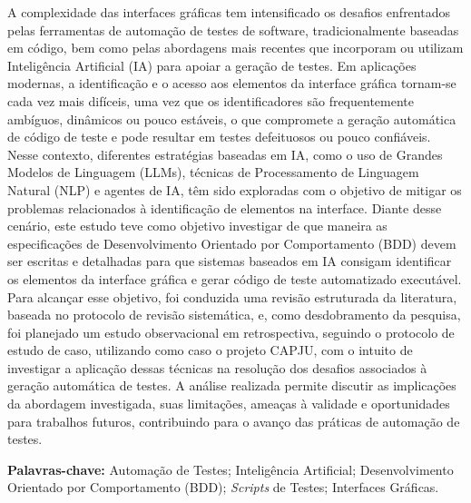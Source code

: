 \begin{resumo}
    A complexidade das interfaces gráficas tem intensificado os desafios enfrentados pelas ferramentas de automação de testes de software, tradicionalmente baseadas em código, bem como pelas abordagens mais recentes que incorporam ou utilizam Inteligência Artificial (IA) para apoiar a geração de testes. Em aplicações modernas, a identificação e o acesso aos elementos da interface gráfica tornam-se cada vez mais difíceis, uma vez que os identificadores são frequentemente ambíguos, dinâmicos ou pouco estáveis, o que compromete a geração automática de código de teste e pode resultar em testes defeituosos ou pouco confiáveis. Nesse contexto, diferentes estratégias baseadas em IA, como o uso de Grandes Modelos de Linguagem (LLMs), técnicas de Processamento de Linguagem Natural (NLP) e agentes de IA, têm sido exploradas com o objetivo de mitigar os problemas relacionados à identificação de elementos na interface. Diante desse cenário, este estudo teve como objetivo investigar de que maneira as especificações de Desenvolvimento Orientado por Comportamento (BDD) devem ser escritas e detalhadas para que sistemas baseados em IA consigam identificar os elementos da interface gráfica e gerar código de teste automatizado executável. Para alcançar esse objetivo, foi conduzida uma revisão estruturada da literatura, baseada no protocolo de revisão sistemática, e, como desdobramento da pesquisa, foi planejado um estudo observacional em retrospectiva, seguindo o protocolo de estudo de caso, utilizando como caso o projeto CAPJU, com o intuito de investigar a aplicação dessas técnicas na resolução dos desafios associados à geração automática de testes. A análise realizada permite discutir as implicações da abordagem investigada, suas limitações, ameaças à validade e oportunidades para trabalhos futuros, contribuindo para o avanço das práticas de automação de testes.

\textbf{Palavras-chave:} Automação de Testes; Inteligência Artificial; Desenvolvimento Orientado por Comportamento (BDD); \textit{Scripts} de Testes; Interfaces Gráficas.
\end{resumo}



